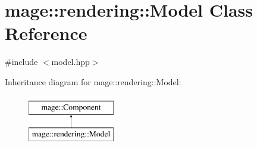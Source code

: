 \hypertarget{classmage_1_1rendering_1_1_model}{}\section{mage\+:\+:rendering\+:\+:Model Class Reference}
\label{classmage_1_1rendering_1_1_model}


{\ttfamily \#include $<$model.\+hpp$>$}

Inheritance diagram for mage\+:\+:rendering\+:\+:Model\+:\begin{figure}[H]
\begin{center}
\leavevmode
\includegraphics[height=2.000000cm]{classmage_1_1rendering_1_1_model}
\end{center}
\end{figure}
